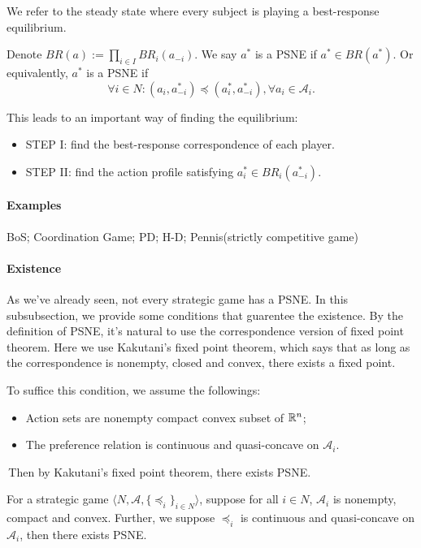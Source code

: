 We refer to the steady state where every subject is playing a best-response equilibrium. 
\begin{definition}
    Denote $BR(a) := \prod_{i\in I} BR_i(a_{-i})$. We say $a^*$ is a PSNE if $a^* \in BR(a^*)$. Or equivalently, $a^*$ is a PSNE if
    $$\forall i \in N : (a_i,a^*_{-i})\preceq (a^*_i,a^*_{-i}), \forall a_i\in\mathcal{A}_i.$$
\end{definition}

This leads to an important way of finding the equilibrium:
\begin{itemize}
    \item STEP I: find the best-response correspondence of each player.
    \item STEP II: find the action profile satisfying $a^*_i\in BR_i (a_{-i}^*)$.
\end{itemize}

\paragraph{Examples}
BoS; Coordination Game; PD; H-D; Pennis(strictly competitive game)

\paragraph{Existence}
As we've already seen, not every strategic game has a PSNE. In this subsubsection, we provide some conditions that guarentee the existence. By the definition of
PSNE, it's natural to use the correspondence version of fixed point theorem. Here we use Kakutani's fixed point theorem, which says that as long as the correspondence is nonempty, closed and convex, there exists a fixed point.

To suffice this condition, we assume the followings:
\begin{itemize}
    \item Action sets are nonempty compact convex subset of $\mathbb{R}^n$;
    \item The preference relation is continuous and quasi-concave on $\mathcal{A}_i$.
\end{itemize}
\,Then by Kakutani's fixed point theorem, there exists PSNE.

\begin{theorem}
    For a strategic game $\langle N,\mathcal{A}, \{\preceq_i\}_{i\in N}  \rangle$, suppose for all $i\in N$, $\mathcal{A}_i$ is nonempty, compact and convex. Further, we suppose $\preceq_i$ is continuous and quasi-concave on $\mathcal{A}_i$, then there exists PSNE.
\end{theorem}

